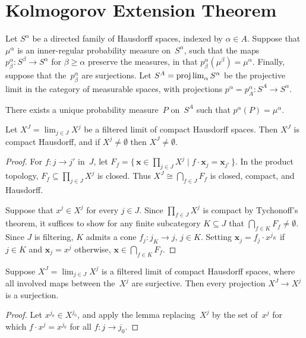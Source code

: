 \chapter	{Kolmogorov Extension Theorem}

Let \( S^\alpha \) be a directed family of Hausdorff spaces,
indexed by \( \alpha \in A \).
Suppose that $\mu^\alpha$ is
an inner-regular probability measure on~$S^\alpha$,
such that the maps \( p_\beta^\alpha \colon S^\beta \to S^\alpha \)
for \( \beta \ge \alpha \)
preserve the measures,
in that \( p_\beta^\alpha(\mu^\beta) = \mu^\alpha \).
Finally, suppose that the~$p_\beta^\alpha$ are surjections.
Let \( S^A = \projlim_\alpha S^\alpha \)
be the projective limit in the category of measurable spaces,
with projections \( p^\alpha = p_A^\alpha \colon S^A \to S^\alpha \).
\begin	{theorem}
\label	{thm:kolmogorov-extension}
There exists a unique probability measure~$P$ on~$S^A$
such that \( p^\alpha(P) = \mu^\alpha \).
\end	{theorem}

\begin	{lemma}
\label	{lem:CH-projlim}
Let \( X^J = \lim_{j \in J} X^j \)
be a filtered limit of compact Hausdorff spaces.
Then $X^J$ is compact Hausdorff,
and if \( X^j \ne \emptyset \) then \( X^J \ne \emptyset \).
\end	{lemma}
\begin	{proof}
For \( f \colon j \to j' \) in~$J$,
let \( F_f = \{\, \mathbf x \in \prod_{j \in J} X^j
\mid f \cdot \mathbf x_j = \mathbf x_{j'} \,\} \).
In the product topology,
\( F_f \subseteq \prod_{j \in J} X^j \) is closed.
Thus \( X^J \cong \bigcap_{f \in J} F_f \) is closed, compact, and Hausdorff.

Suppose that \( x^j \in X^j \) for every \( j \in J \).
Since \( \prod_{f \in J} X^j \) is compact by Tychonoff's theorem,
it suffices to show for any finite subcategory \( K \subseteq J \)
that \( \bigcap_{f \in K} F_f \ne \emptyset \).
Since $J$ is filtering,
$K$ admits a cone \( f_j \colon j_K \to j \), \( j \in K \).
Setting \( \mathbf x_j = f_j \cdot x^{j_K} \) if \( j \in K \)
and \( \mathbf x_j = x^j \) otherwise,
\( \mathbf x \in \bigcap_{f \in K} F_f \).
\end	{proof}

\begin	{corollary}
\label	{cor:surjective-projections}
Suppose \( X^J = \lim_{j \in J} X^j \) is a filtered limit
of compact Hausdorff spaces,
where all involved maps between the~$X^j$ are surjective.
Then every projection \( X^J \to X^j \) is a surjection.
\end	{corollary}
\begin	{proof}
Let \( x^{j_0} \in X^{j_0} \),
and apply the lemma replacing~$X^j$
by the set of~$x^j$ for which \( f \cdot x^j = x^{j_0} \)
for all \( f \colon j \to j_0 \).
\end	{proof}

